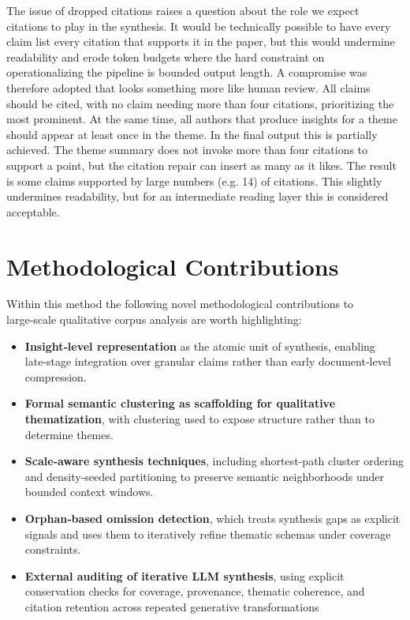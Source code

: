 \documentclass[
  11pt,
]{article}
\providecommand{\tightlist}{%
  \setlength{\itemsep}{0pt}\setlength{\parskip}{0pt}}
\begin{document}
The issue of dropped citations raises a question about the role we expect citations to 
play in the synthesis. It would be technically possible to have every claim list every 
citation that supports it in the paper, but this would undermine readability and erode 
token budgets where the hard constraint on operationalizing the pipeline is bounded output 
length. A compromise was therefore adopted that looks something more like human review. 
All claims should be cited, with no claim needing more than four citations, prioritizing 
the most prominent. At the same time, all authors that produce insights for a theme should 
appear at least once in the theme. In the final output this is partially achieved. The theme 
summary does not invoke more than four citations to support a point, but the citation repair 
can insert as many as it likes. The result is some claims supported by large numbers 
(e.g. 14) of citations. This slightly undermines readability, but for an intermediate 
reading layer this is considered acceptable. 

\section{Methodological Contributions}\label{methodological-contributions}

Within this method the following novel methodological contributions to
large‑scale qualitative corpus analysis are worth highlighting:

\begin{itemize}
\tightlist
\item
  \textbf{Insight‑level representation} as the atomic unit of synthesis,
  enabling late‑stage integration over granular claims rather than early
  document‑level compression.
\item
  \textbf{Formal semantic clustering as scaffolding for qualitative
  thematization}, with clustering used to expose structure rather than
  to determine themes.
\item
  \textbf{Scale‑aware synthesis techniques}, including shortest-path
  cluster ordering and density-seeded partitioning to preserve semantic
  neighborhoods under bounded context windows.
\item
  \textbf{Orphan‑based omission detection}, which treats synthesis gaps
  as explicit signals and uses them to iteratively refine thematic
  schemas under coverage constraints.
\item
 \textbf{External auditing of iterative LLM synthesis}, using explicit 
conservation checks for coverage, provenance, thematic coherence, and citation 
retention across repeated generative transformations
\end{itemize}
\end{document}
